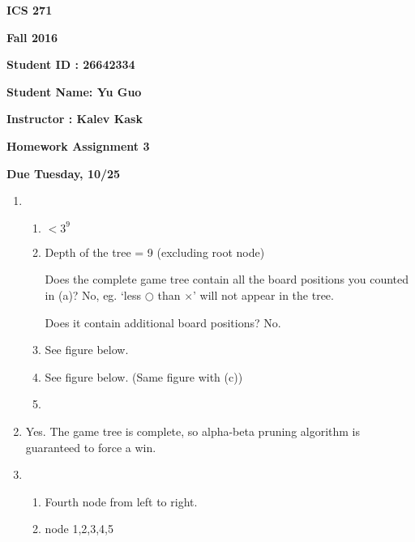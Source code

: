 \documentclass{article}
\begin{document}
{\bf ICS 271}

{\bf Fall 2016}

{\bf Student ID : 26642334}

{\bf Student Name: Yu Guo}

{\bf Instructor : Kalev Kask}

{\bf Homework Assignment 3}

{\bf Due Tuesday, 10/25}




\begin{enumerate}

\item

  \begin{enumerate}
    \item $<3^9$

    \item Depth of the tree = 9 (excluding root node)

    Does the complete game tree contain all the board positions you counted in (a)? No, eg. `less $\bigcirc$ than $\times$' will not appear in the tree. 

    Does it contain additional board positions? No.

    \item See figure below. 


    \item See figure below. (Same figure with (c))


    \item 


  \end{enumerate}


\item

Yes. The game tree is complete, so alpha-beta pruning algorithm is guaranteed to force a win.

\item
  
  \begin{enumerate}
    \item Fourth node from left to right.


    \item node 1,2,3,4,5
  \end{enumerate}



\end{enumerate}
\end{document}
